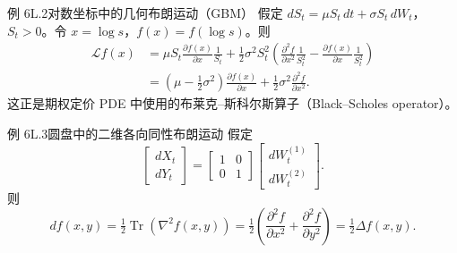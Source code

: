 \begin{statement}{例 6L.2}{对数坐标中的几何布朗运动（GBM）}
假定 $dS_t=\mu S_t\,dt+\sigma S_t\,dW_t$，$S_t>0$。令 $x=\log s$，$f(x)=f(\log s)$。则
\[
  \begin{aligned}
   \mathcal L f(x)
      &=\mu S_t\frac{\partial f(x)}{\partial x}\frac{1}{S_t}
        +\tfrac12\sigma^2 S_t^2\left(
          \frac{\partial^2 f}{\partial x^2}\frac1{S_t^2}
            -\frac{\partial f(x)}{\partial x}\frac1{S_t^2}\right)\\
      &=\left(\mu-\tfrac12\sigma^2\right)\frac{\partial f(x)}{\partial x}
          +\tfrac12\sigma^2\frac{\partial^2 f}{\partial x^2}.
  \end{aligned}
\]
这正是期权定价 PDE 中使用的布莱克–斯科尔斯算子（Black–Scholes operator）。
\end{statement}

\begin{statement}{例 6L.3}{圆盘中的二维各向同性布朗运动}
假定
\[
  \begin{bmatrix}dX_t\\dY_t\end{bmatrix}
    =\begin{bmatrix}1&0\\0&1\end{bmatrix}
      \begin{bmatrix}dW_t^{(1)}\\dW_t^{(2)}\end{bmatrix}.
\]
则
\[
  df(x,y)=\tfrac12\operatorname{Tr}(\nabla^2 f(x,y))
    =\tfrac12\left(\frac{\partial^2 f}{\partial x^2}+\frac{\partial^2 f}{\partial y^2}\right)
    =\tfrac12\Delta f(x,y).
\]
\end{statement}

